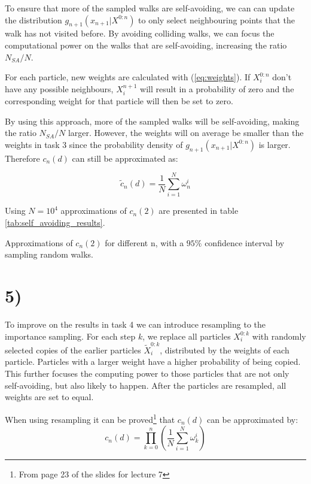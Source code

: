 \documentclass[a4paper]{article}
\begin{document}
To ensure that more of the sampled walks are self-avoiding, we can can update the distribution $g_{n+1}(x_{n+1}|X^{0:n})$ to only select neighbouring points that the walk has not visited before. By avoiding colliding walks, we can focus the computational power on the walks that are self-avoiding, increasing the ratio $N_{SA}/N$. 

For each particle, new weights are calculated with (\ref{eq:weights}). If $X_i^{0:n}$ don't have any possible neighbours, $X_i^{n+1}$ will result in a probability of zero and the corresponding weight for that particle will then be set to zero.

By using this approach, more of the sampled walks will be self-avoiding, making the ratio $N_{SA}/N$ larger. However, the weights will on average be smaller than the weights in task 3 since the probability density of $g_{n+1}(x_{n+1}|X^{0:n})$ is larger. Therefore $c_n(d)$ can still be approximated as:

\begin{equation}
    \tilde{c}_n(d) = \frac{1}{N}\sum_{i=1}^N\omega_n^i
\end{equation}

Using $N = 10^4$ approximations of $c_n(2)$ are presented in table \ref{tab:self_avoiding_results}.

\begin{table}[H]
    \centering
    \caption{Approximations of $c_n(2)$ for different n, with a $95\%$ confidence interval by sampling random walks.}
    \label{tab:self_avoiding_results}
    
\end{table}

\section*{5)}
To improve on the results in task 4 we can introduce resampling to the importance sampling. For each step $k$, we replace all particles $X_i^{0:k}$ with randomly selected copies of the earlier particles $\widetilde{X}_i^{0:k}$, distributed by the weights of each particle. Particles with a larger weight have a higher probability of being copied. This further focuses the computing power to those particles that are not only self-avoiding, but also likely to happen. After the particles are resampled, all weights are set to equal.

When using resampling it can be proved\footnote{From page 23 of the slides for lecture 7} that $c_n(d)$ can be approximated by:
\begin{equation}
    c_n(d) = \prod_{k = 0}^n(\frac{1}{N}\sum_{i=1}^N\omega_k^i)
\end{equation}
\end{document}
